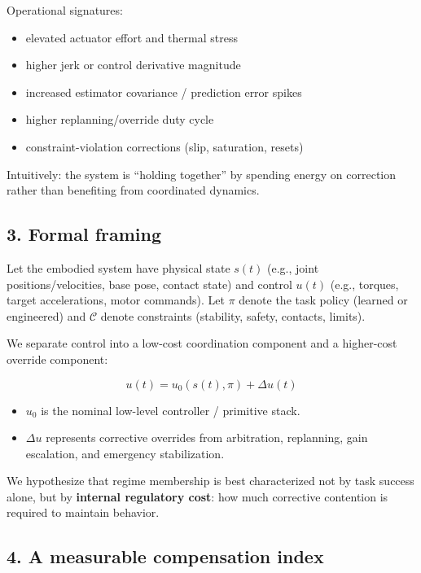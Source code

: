 \documentclass[11pt]{article}
\providecommand{\tightlist}{%
  \setlength{\itemsep}{0pt}\setlength{\parskip}{0pt}}
\begin{document}
Operational signatures:

\begin{itemize}
\tightlist
\item
  elevated actuator effort and thermal stress
\item
  higher jerk or control derivative magnitude
\item
  increased estimator covariance / prediction error spikes
\item
  higher replanning/override duty cycle
\item
  constraint-violation corrections (slip, saturation, resets)
\end{itemize}

Intuitively: the system is ``holding together'' by spending energy on correction rather than benefiting from coordinated dynamics.

\hypertarget{formal-framing}{%
\subsection{3. Formal framing}\label{formal-framing}}

Let the embodied system have physical state \(s(t)\) (e.g., joint positions/velocities, base pose, contact state) and control \(u(t)\) (e.g., torques, target accelerations, motor commands). Let \(\pi\) denote the task policy (learned or engineered) and \(\mathcal{C}\) denote constraints (stability, safety, contacts, limits).

We separate control into a low-cost coordination component and a higher-cost override component:

\[
 u(t) = u_0(s(t), \pi) + \Delta u(t)
\]

\begin{itemize}
\tightlist
\item
  \(u_0\) is the nominal low-level controller / primitive stack.
\item
  \(\Delta u\) represents corrective overrides from arbitration, replanning, gain escalation, and emergency stabilization.
\end{itemize}

We hypothesize that regime membership is best characterized not by task success alone, but by \textbf{internal regulatory cost}: how much corrective contention is required to maintain behavior.

\hypertarget{a-measurable-compensation-index}{%
\subsection{4. A measurable compensation index}\label{a-measurable-compensation-index}}
\end{document}
